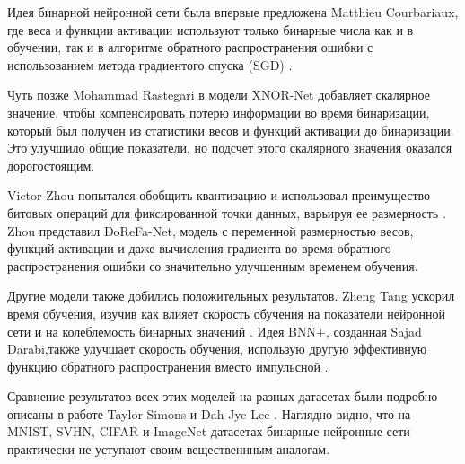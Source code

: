     Идея бинарной нейронной сети была впервые предложена Matthieu Courbariaux, где веса и функции активации используют только бинарные числа как и в обучении, так и в алгоритме обратного распространения ошибки с использованием метода градиентого спуска (SGD) \cite{first}.
    
    Чуть позже Mohammad Rastegari в модели XNOR-Net \cite{second} добавляет скалярное значение, чтобы компенсировать потерю информации во время бинаризации, который был получен из статистики весов и функций активации до бинаризации. Это улучшило общие показатели, но подсчет этого скалярного значения оказался дорогостоящим.
    
    Victor Zhou попытался обобщить квантизацию и использовал преимущество битовых операций для фиксированной точки данных, варьируя ее размерность \cite{third}. Zhou представил DoReFa-Net, модель с переменной размерностью весов, функций активации и даже вычисления градиента во время обратного распространения ошибки со значительно улучшенным временем обучения.
    
    Другие модели также добились положительных результатов. Zheng Tang ускорил время обучения, изучив как влияет скорость обучения на показатели нейронной сети и на колеблемость бинарных значений \cite{fourth}. Идея BNN+, созданная Sajad Darabi,также улучшает скорость обучения, использую другую эффективную функцию обратного распространения вместо импульсной \cite{fifth}.
    
    Сравнение результатов всех этих моделей на разных датасетах были подробно описаны в работе Taylor Simons и Dah-Jye Lee \cite{sixth}. Наглядно видно, что на MNIST, SVHN, CIFAR и ImageNet датасетах бинарные нейронные сети практически не уступают своим вещественнным аналогам.